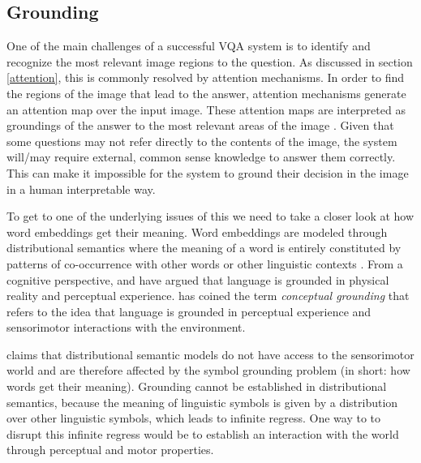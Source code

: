 \documentclass{article}
\begin{document}
\subsection{Grounding}

One of the main challenges of a successful VQA system is to identify and recognize the most relevant image regions to the question. As discussed in section \ref{attention}, this is commonly resolved by attention mechanisms. In order to find the regions of the image that lead to the answer, attention mechanisms generate an attention map over the input image. These attention maps are interpreted as groundings of the answer to the most relevant areas of the image \citep{zhang2019interpretable}. Given that some questions may not refer directly to the contents of the image, the system will/may require external, common sense knowledge to answer them correctly. This can make it impossible for the system to ground their decision in the image in a human interpretable way.

To get to one of the underlying issues of this we need to take a closer look at how word embeddings get their meaning. Word embeddings are modeled through distributional semantics where the meaning of a word is entirely constituted by patterns of co-occurrence with other words or other linguistic contexts \citep{baroni2016grounding}. From a cognitive perspective, \cite{barsalou1999perceptual} and \cite{fincher2001perceptual} have argued that language is grounded in physical reality and perceptual experience. \cite{barsalou2008grounded} has coined the term \textit{conceptual grounding} that refers to the idea that language is grounded in perceptual experience and sensorimotor interactions with the environment.

\cite{baroni2016grounding} claims that distributional semantic models do not have access to the sensorimotor world and are therefore affected by the symbol grounding problem \cite{harnad1990symbol} (in short: how words get their meaning). Grounding cannot be established in distributional semantics, because the meaning of linguistic symbols is given by a distribution over other linguistic symbols, which leads to infinite regress. One way to to disrupt this infinite regress would be to establish an interaction with the world through perceptual and motor properties.
\end{document}
